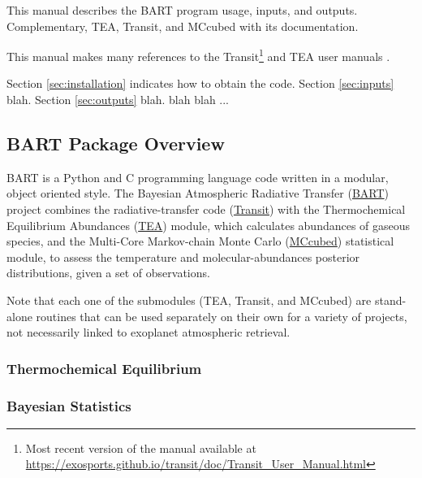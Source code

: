 \documentclass[letterpaper, 12pt]{article}
\begin{document}
This manual describes the BART program usage, inputs, and outputs.
Complementary, TEA, Transit, and MCcubed with its documentation.


This manual makes many references to the Transit\footnote{Most recent version of the manual available at 
\href{https://exosports.github.io/transit/doc/Transit_User_Manual.html}{https://exosports.github.io/transit/doc/Transit\_User\_Manual.html}} and TEA user manuals
.

Section \ref{sec:installation} indicates how to obtain the code.
Section \ref{sec:inputs} blah.  Section \ref{sec:outputs} blah. blah
blah ...


\subsection{BART Package Overview}

BART is a Python and C programming language code written in a modular,
object oriented style.  The Bayesian Atmospheric Radiative Transfer
(\href{https://github.com/exosports/BART}{BART}) project combines the
radiative-transfer code
(\href{https://github.com/exosports/transit}{Transit}) with the
Thermochemical Equilibrium Abundances
(\href{https://github.com/dzesmin/TEA}{TEA}) module, which calculates
abundances of gaseous species, and the Multi-Core Markov-chain Monte
Carlo (\href{https://github.com/pcubillos/MCcubed}{MCcubed})
statistical module, to assess the temperature and molecular-abundances
posterior distributions, given a set of observations.


Note that each one of the submodules (TEA, Transit, and MCcubed) are
stand-alone routines that can be used separately on their own for a
variety of projects, not necessarily linked to exoplanet atmospheric
retrieval.
 
\subsubsection{Thermochemical Equilibrium}

\subsubsection{Bayesian Statistics}
\end{document}
